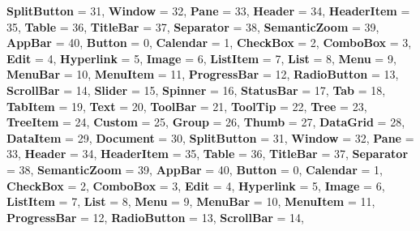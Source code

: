 \begin{DoxyCompactItemize}
{\bfseries Split\+Button} = 31, 
{\bfseries Window} = 32, 
{\bfseries Pane} = 33, 
{\bfseries Header} = 34, 
\newline
{\bfseries Header\+Item} = 35, 
{\bfseries Table} = 36, 
{\bfseries Title\+Bar} = 37, 
{\bfseries Separator} = 38, 
\newline
{\bfseries Semantic\+Zoom} = 39, 
{\bfseries App\+Bar} = 40, 
{\bfseries Button} = 0, 
{\bfseries Calendar} = 1, 
\newline
{\bfseries Check\+Box} = 2, 
{\bfseries Combo\+Box} = 3, 
{\bfseries Edit} = 4, 
{\bfseries Hyperlink} = 5, 
\newline
{\bfseries Image} = 6, 
{\bfseries List\+Item} = 7, 
{\bfseries List} = 8, 
{\bfseries Menu} = 9, 
\newline
{\bfseries Menu\+Bar} = 10, 
{\bfseries Menu\+Item} = 11, 
{\bfseries Progress\+Bar} = 12, 
{\bfseries Radio\+Button} = 13, 
\newline
{\bfseries Scroll\+Bar} = 14, 
{\bfseries Slider} = 15, 
{\bfseries Spinner} = 16, 
{\bfseries Status\+Bar} = 17, 
\newline
{\bfseries Tab} = 18, 
{\bfseries Tab\+Item} = 19, 
{\bfseries Text} = 20, 
{\bfseries Tool\+Bar} = 21, 
\newline
{\bfseries Tool\+Tip} = 22, 
{\bfseries Tree} = 23, 
{\bfseries Tree\+Item} = 24, 
{\bfseries Custom} = 25, 
\newline
{\bfseries Group} = 26, 
{\bfseries Thumb} = 27, 
{\bfseries Data\+Grid} = 28, 
{\bfseries Data\+Item} = 29, 
\newline
{\bfseries Document} = 30, 
{\bfseries Split\+Button} = 31, 
{\bfseries Window} = 32, 
{\bfseries Pane} = 33, 
\newline
{\bfseries Header} = 34, 
{\bfseries Header\+Item} = 35, 
{\bfseries Table} = 36, 
{\bfseries Title\+Bar} = 37, 
\newline
{\bfseries Separator} = 38, 
{\bfseries Semantic\+Zoom} = 39, 
{\bfseries App\+Bar} = 40, 
{\bfseries Button} = 0, 
\newline
{\bfseries Calendar} = 1, 
{\bfseries Check\+Box} = 2, 
{\bfseries Combo\+Box} = 3, 
{\bfseries Edit} = 4, 
\newline
{\bfseries Hyperlink} = 5, 
{\bfseries Image} = 6, 
{\bfseries List\+Item} = 7, 
{\bfseries List} = 8, 
\newline
{\bfseries Menu} = 9, 
{\bfseries Menu\+Bar} = 10, 
{\bfseries Menu\+Item} = 11, 
{\bfseries Progress\+Bar} = 12, 
\newline
{\bfseries Radio\+Button} = 13, 
{\bfseries Scroll\+Bar} = 14, 

\end{DoxyCompactItemize}
